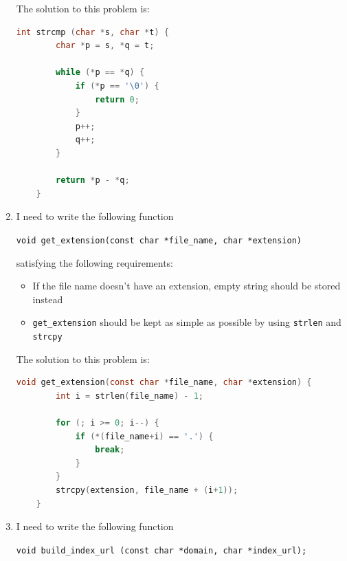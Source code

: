\documentclass[12pt]{article}
\begin{document}
\begin{enumerate}[1.]
    \bigskip

    The solution to this problem is:

    \bigskip

\begin{lstlisting}[language=c]
    int strcmp (char *s, char *t) {
        char *p = s, *q = t;

        while (*p == *q) {
            if (*p == '\0') {
                return 0;
            }
            p++;
            q++;
        }

        return *p - *q;
    }
\end{lstlisting}

    \bigskip

    \item

    I need to write the following function

    \bigskip

    \texttt{void get\_extension(const char *file\_name, char *extension)}

    \bigskip

    satisfying the following requirements:

    \begin{itemize}
        \item If the file name doesn't have an extension, empty string should be stored instead
        \item \texttt{get\_extension} should be kept as simple as possible by using \texttt{strlen} and \texttt{strcpy}
    \end{itemize}

    \bigskip

    The solution to this problem is:

    \bigskip

\begin{lstlisting}[language=c]
    void get_extension(const char *file_name, char *extension) {
        int i = strlen(file_name) - 1;

        for (; i >= 0; i--) {
            if (*(file_name+i) == '.') {
                break;
            }
        }
        strcpy(extension, file_name + (i+1));
    }
\end{lstlisting}

    \item

    I need to write the following function

    \bigskip

    \texttt{void build\_index\_url (const char *domain, char *index\_url);}


\end{enumerate}
\end{document}
